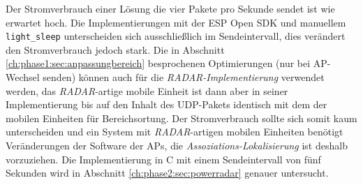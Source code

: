 Der Stromverbrauch einer Lösung die vier Pakete pro Sekunde sendet ist wie erwartet hoch.
Die Implementierungen mit der ESP Open SDK und manuellem \texttt{light\_sleep} unterscheiden sich ausschließlich im Sendeintervall, dies verändert den Stromverbrauch jedoch stark.
Die in Abschnitt \ref{ch:phase1:sec:anpassungbereich} besprochenen Optimierungen (nur bei AP-Wechsel senden) können auch für die \emph{RADAR-Implementierung} verwendet werden, das \emph{RADAR}-artige mobile Einheit ist dann aber in seiner Implementierung bis auf den Inhalt des UDP-Pakets identisch mit dem der mobilen Einheiten für Bereichsortung.
Der Stromverbrauch sollte sich somit kaum unterscheiden und ein System mit \emph{RADAR}-artigen mobilen Einheiten benötigt Veränderungen der Software der APs, die \emph{Assoziations-Lokalisierung} ist deshalb vorzuziehen. 
Die Implementierung in C mit einem Sendeintervall von fünf Sekunden wird in Abschnitt \ref{ch:phase2:sec:powerradar} genauer untersucht.

